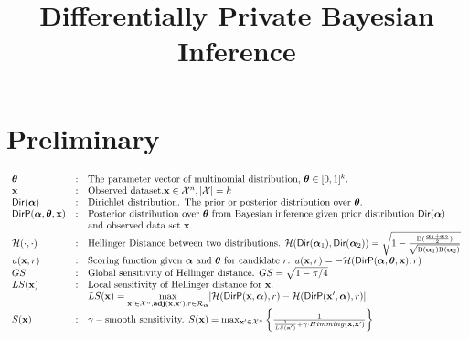 \documentclass{article}
\begin{document}
\title{ Differentially Private Bayesian Inference}
%
\author{} %
\date{}
\maketitle
%
\vspace{-50pt}
\section{Preliminary}
\[
\begin{array}{lcl}
	\boldsymbol{\theta} 
	& : &
	\mbox{The parameter vector of multinomial distribution, $\boldsymbol{\theta}\in [0,1]^{k}$}.\\
	\textbf{x} 
	& : &
	\mbox{Observed dataset.}
	\textbf{x} \in \mathcal{X}^n, |\mathcal{X}| = k\\
	\mathsf{Dir}(\boldsymbol{\alpha}) 
	& : &
	\mbox{Dirichlet distribution. The prior or posterior distribution over $\boldsymbol{\theta}$.}\\
	\mathsf{DirP}(\boldsymbol{\alpha}, \boldsymbol{\theta}, \textbf{x})
	& : & 
	\mbox{Posterior distribution over $\boldsymbol{\theta}$ from Bayesian inference given prior distribution $\mathsf{Dir}(\boldsymbol{\alpha})$}\\
	& &
	\mbox{and observed data set $\textbf{x}$.}\\
	\mathcal{H}(\cdot, \cdot)
	& : &
   \mbox{Hellinger Distance between two distributions. }
   \mathcal{H}(\mathsf{Dir}(\boldsymbol{\alpha}_1), \mathsf{Dir}(\boldsymbol{\alpha}_2)) = \sqrt{1 - \frac{\textup{B}(\frac{\boldsymbol{\alpha}_1 + \boldsymbol{\alpha}_2}{2})}{\sqrt{\textup{B}(\boldsymbol{\alpha}_1) \textup{B}(\boldsymbol{\alpha}_2)}}} \\
   u(\textbf{x}, r)
   & : &
   \mbox{Scoring function given $\boldsymbol{\alpha}$ and $\boldsymbol{\theta}$ for candidate $r$. }
   u(\textbf{x}, r) =
   -\mathcal{H}(\mathsf{DirP}(\boldsymbol{\alpha}, \boldsymbol{\theta}, \textbf{x}), r)\\
   GS
   & : & 
   \mbox{Global sensitivity of Hellinger distance. }
   GS = \sqrt{1 - \pi/4}\\
   LS(\textbf{x})
   & : & 
   \mbox{Local sensitivity of Hellinger distance for $\textbf{x}$. }\\
   & &
   LS(\textbf{x}) = \max\limits_{\textbf{x}'\in\mathcal{X}^n,\textbf{adj}(\textbf{x},\textbf{x}'), r\in \mathcal{R}_{\boldsymbol{\alpha}}}
   \lvert \mathcal{H}(\mathsf{DirP}(\textbf{x},\boldsymbol{\alpha}), r) - \mathcal{H}(\mathsf{DirP}(\textbf{x}',\boldsymbol{\alpha}), r)\rvert \\
   S(\textbf{x})
   & : & 
   \gamma-\mbox{smooth sensitivity. }
   S(\textbf{x})=\max_{\textbf{x}' \in \mathcal{X}^{n}}\bigg \{ \frac{1}{\frac{1}{LS(\textbf{x}')} +\gamma \cdot Himming(\textbf{x},\textbf{x}')} \bigg \}
\end{array}
\]
%
\end{document}
